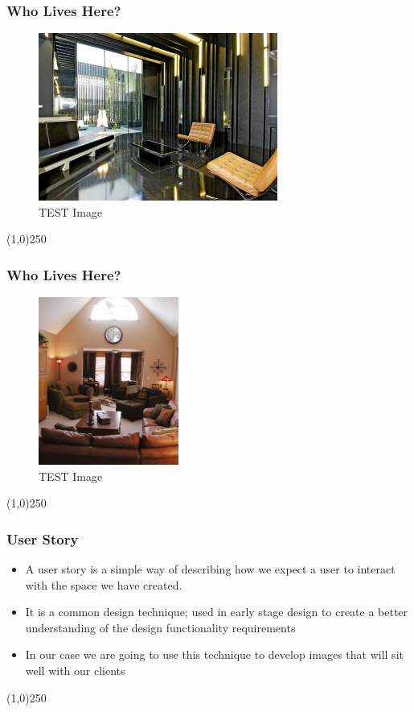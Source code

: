 \begin{frame}
\frametitle{Who Lives Here?}
\begin{figure}
	\centering
		\includegraphics[height=5.5cm]{img/J.jpg}
	\caption{TEST Image}
	\label{fig:SampleJ}
\end{figure}
\end{frame}
\begin{center}\line(1,0){250}\end{center}



\begin{frame}
\frametitle{Who Lives Here?}
\begin{figure}
	\centering
		\includegraphics[height=5.5cm]{img/K.jpg}
	\caption{TEST Image}
	\label{fig:SampleK}
\end{figure}
\end{frame}
\begin{center}\line(1,0){250}\end{center}



\begin{frame}
\frametitle{User Story}
\begin{itemize}
	\item A user story is a simple way of describing how we expect a user to interact with the space we have created.
	\item It is a common design technique; used in early stage design to create a better understanding of the design functionality requirements
	\item In our case we are going to use this technique to develop images that will sit well with our clients
\end{itemize}
\end{frame}
\begin{center}\line(1,0){250}\end{center}



